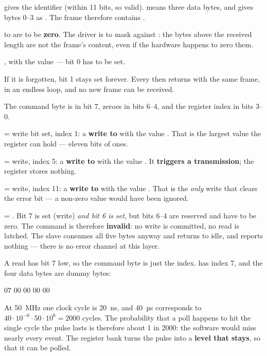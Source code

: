   gives the identifier \textbf{} (within 11 bits, so
valid).  means three data bytes, and  gives bytes
0--3 as . The frame therefore contains \textbf{}.

 to  are to be \textbf{zero}. The driver is to mask
against : the bytes above the received length are not the frame's content, even if the
hardware happens to zero them.

 , with the value  --- bit 0 has to be set.

If it is forgotten,  bit 1 stays set forever. Every  then returns
 with the same frame, in an endless loop, and no new frame can be received.

The command byte is  in bit 7, zeroes in bits 6--4, and the register index in bits 3--0.

  = write bit set, index 1: a \textbf{write to } with the value
. That is the largest value the register can hold --- eleven bits of ones.

  = write, index 5: a \textbf{write to } with the value
. It \textbf{triggers a transmission}; the register stores nothing.

  = write, index 11: a \textbf{write to } with the value
. That is the \emph{only} write that clears the error bit --- a non-zero value would have
been ignored.

  = . Bit 7 is set (write) \emph{and bit 6 is set}, but bits
6--4 are reserved and have to be zero. The command is therefore \textbf{invalid}: no write is
committed, no read is latched. The slave consumes all five bytes anyway and returns to idle, and
reports nothing --- there is no error channel at this layer.

 A read has bit 7 low, so the command byte is just the index.  has index 7,
and the four data bytes are dummy bytes:

\begin{console}
07 00 00 00 00
\end{console}

 At 50~MHz one clock cycle is 20~ns, and 40~µs corresponds to $40 \cdot 10^{-6} \cdot 50
\cdot 10^{6} = 2000$ cycles. The probability that a poll happens to hit the single cycle the pulse
lasts is therefore about 1 in 2000: the software would miss nearly every event. The register bank
turns the pulse into a \textbf{level that stays}, so that it can be polled.

